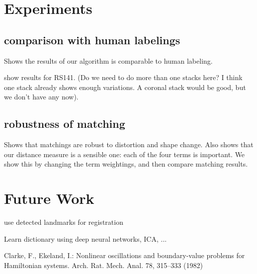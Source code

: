\documentclass{llncs}
\begin{document}
\section{Experiments}

\subsection{comparison with human labelings}

Shows the results of our algorithm is comparable to human labeling.

show results for RS141. (Do we need to do more than one stacks here? I think one stack already shows enough variations. A coronal stack would be good, but we don't have any now).

\subsection{robustness of matching}

Shows that matchings are robust to distortion and shape change.
Also shows that our distance measure is a sensible one: each of the four terms is important. We show this by changing the term weightings, and then compare matching results.

\section{Future Work}

use detected landmarks for registration

Learn dictionary using deep neural networks, ICA, ...



%
%
\begin{thebibliography}{5}
%
Clarke, F., Ekeland, I.:
Nonlinear oscillations and
boundary-value problems for Hamiltonian systems.
Arch. Rat. Mech. Anal. 78, 315--333 (1982)

\end{thebibliography}
\end{document}
